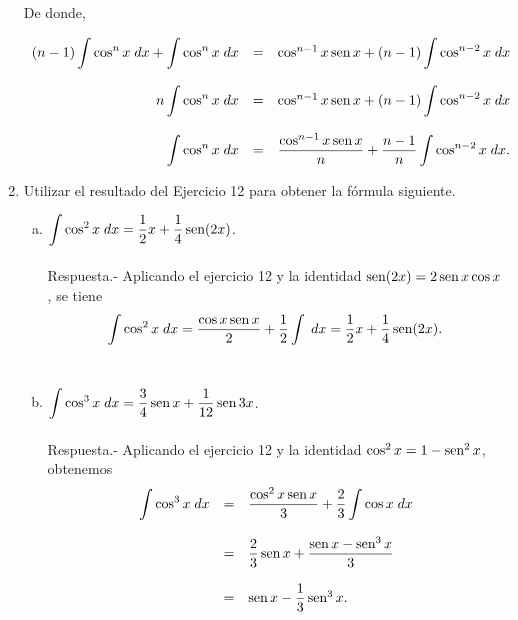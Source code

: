 \begin{enumerate}[\bfseries 1.]
	De donde,

	$$
	\begin{array}{rcl}
	    \displaystyle (n-1)\int \cos^n x\;dx + \int \cos^n x\; dx &=& \cos^{n-1}x\mathop{\mbox{\normalfont sen}}\nolimits x + (n-1)\displaystyle\int \cos^{n-2}x\; dx\\\\
	    n\displaystyle\int \cos^n x\; dx &=& \cos^{n-1}x\mathop{\mbox{\normalfont sen}}\nolimits x + (n-1)\displaystyle\int \cos^{n-2}x\; dx\\\\
	    \displaystyle\int \cos^n x\; dx &=& \dfrac{\cos^{n-1}x\mathop{\mbox{\normalfont sen}}\nolimits x}{n} + \dfrac{n-1}{n}\displaystyle\int \cos^{n-2}x\; dx.
	\end{array}
	$$
	\vspace{.5cm}

    \item Utilizar el resultado del Ejercicio 12 para obtener la fórmula siguiente.

	\begin{enumerate}[(a)]

	    \item $\displaystyle\int \cos^2 x\; dx = \dfrac{1}{2}x+\dfrac{1}{4}\mathop{\mbox{\normalfont sen}}\nolimits(2x)$.\\\\
		Respuesta.-\; Aplicando el ejercicio 12 y la identidad $\mathop{\mbox{\normalfont sen}}\nolimits(2x)=2\mathop{\mbox{\normalfont sen}}\nolimits x \cos x$, se tiene
		$$\int\cos^2 x\; dx = \dfrac{\cos x \mathop{\mbox{\normalfont sen}}\nolimits x}{2}+\dfrac{1}{2}\int \; dx=\dfrac{1}{2}x+\dfrac{1}{4}\mathop{\mbox{\normalfont sen}}\nolimits(2x).$$\\

	    \item $\displaystyle\int \cos^3 x\; dx = \dfrac{3}{4}\mathop{\mbox{\normalfont sen}}\nolimits x + \dfrac{1}{12}\mathop{\mbox{\normalfont sen}}\nolimits 3x$.\\\\
		Respuesta.-\; Aplicando el ejercicio 12 y la identidad $\cos^2 x = 1-\mathop{\mbox{\normalfont sen}}\nolimits^2 x$, obtenemos
		$$
		\begin{array}{rcl}
		    \displaystyle\int \cos^3 x\; dx &=& \dfrac{\cos^2x\mathop{\mbox{\normalfont sen}}\nolimits x}{3}+\dfrac{2}{3}\displaystyle\int \cos x\; dx\\\\
						    &=& \dfrac{2}{3}\mathop{\mbox{\normalfont sen}}\nolimits x + \dfrac{\mathop{\mbox{\normalfont sen}}\nolimits x-\mathop{\mbox{\normalfont sen}}\nolimits^3x}{3}\\\\
						    &=& \mathop{\mbox{\normalfont sen}}\nolimits x-\dfrac{1}{3}\mathop{\mbox{\normalfont sen}}\nolimits^3 x.
		\end{array}
		$$
		\vspace{.5cm}


\end{enumerate}
\end{enumerate}
